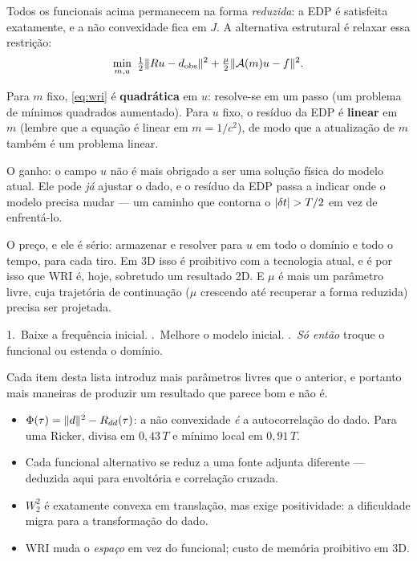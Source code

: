 \documentclass[11pt,a4paper,oneside]{report}
\begin{document}
\begin{teoria}
Todos os funcionais acima permanecem na forma \emph{reduzida}: a EDP \'e
satisfeita exatamente, e a n\~ao convexidade fica em $J$. A alternativa
estrutural \'e relaxar essa restri\c{c}\~ao:
\begin{equation}
\min_{m,u}\
 \tfrac12\lVert Ru - d_{\text{obs}} \rVert^{2}
 + \tfrac{\mu}{2}\lVert \mathcal{A}(m)u - f \rVert^{2} .
\label{eq:wri}
\end{equation}

Para $m$ fixo, \eqref{eq:wri} \'e \textbf{quadr\'atica} em $u$: resolve-se em
um passo (um problema de m\'inimos quadrados aumentado). Para $u$ fixo, o
res\'iduo da EDP \'e \textbf{linear} em $m$ (lembre que a equa\c{c}\~ao \'e
linear em $m=1/c^{2}$), de modo que a atualiza\c{c}\~ao de $m$ tamb\'em \'e um
problema linear.

O ganho: o campo $u$ n\~ao \'e mais obrigado a ser uma solu\c{c}\~ao
f\'isica do modelo atual. Ele pode \emph{j\'a} ajustar o dado, e o res\'iduo da
EDP passa a indicar onde o modelo precisa mudar --- um caminho que contorna o
$\lvert \delta t \rvert>T/2$ em vez de enfrent\'a-lo.

O pre\c{c}o, e ele \'e s\'erio: armazenar e resolver para $u$ em todo o
dom\'inio e todo o tempo, para cada tiro. Em 3D isso \'e proibitivo com a
tecnologia atual, e \'e por isso que WRI \'e, hoje, sobretudo um resultado 2D.
E $\mu$ \'e mais um par\^ametro livre, cuja trajet\'oria de continua\c{c}\~ao
($\mu$ crescendo at\'e recuperar a forma reduzida) precisa ser projetada.
\end{teoria}

\begin{pratica}
1.~Baixe a frequ\^encia inicial. .~Melhore o modelo inicial. \quad
3.~\emph{S\'o ent\~ao} troque o funcional ou estenda o dom\'inio.

Cada item desta lista introduz mais par\^ametros livres que o anterior, e
portanto mais maneiras de produzir um resultado que parece bom e n\~ao \'e.
\end{pratica}

\begin{resumo}
\begin{itemize}[leftmargin=*, itemsep=1pt]
\item $\Phi(\tau) = \lVert d \rVert^{2} - R_{dd}(\tau)$: a n\~ao convexidade \emph{\'e}
a autocorrela\c{c}\~ao do dado. Para uma Ricker, divisa em $0{,}43\,T$ e
m\'inimo local em $0{,}91\,T$.
\item Cada funcional alternativo se reduz a uma fonte adjunta diferente ---
deduzida aqui para envolt\'oria e correla\c{c}\~ao cruzada.
\item $W_2^{2}$ \'e exatamente convexa em transla\c{c}\~ao, mas exige
positividade: a dificuldade migra para a transforma\c{c}\~ao do dado.
\item WRI muda o \emph{espa\c{c}o} em vez do funcional; custo de mem\'oria
proibitivo em 3D.
\end{itemize}
\end{resumo}
\end{document}
